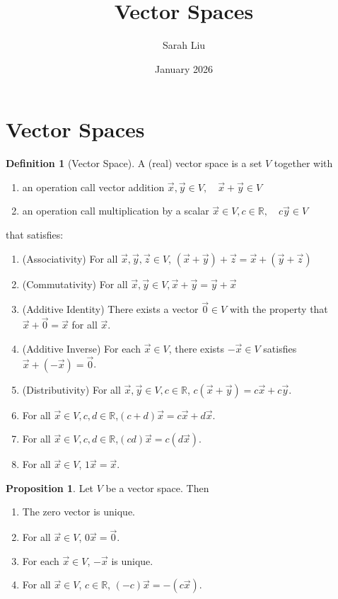 \documentclass{article}
\title{Vector Spaces}
\author{Sarah Liu}
\date{January 2026}
\theoremstyle{definition}
\newtheorem{proposition}[theorem]{Proposition}
\newtheorem{definition}[theorem]{Definition}
\theoremstyle{remark}
\begin{document}
\maketitle

\section{Vector Spaces}
\begin{definition}[Vector Space]
A (real) vector space is a set $V$ together with
\begin{enumerate}
    \item an operation call vector addition $\vec{x},\vec{y}\in V,\quad \vec{x}+\vec{y}\in V$
    \item an operation call multiplication by a scalar $\vec{x}\in V,c\in \mathbb{R}, \quad c\vec{y}\in V$
\end{enumerate}
that satisfies:
\begin{enumerate}
    \item (Associativity) For all $\vec{x},\vec{y}, \vec{z}\in V$, $(\vec{x}+\vec{y})+ \vec{z} = \vec{x}+(\vec{y}+ \vec{z})$
    \item (Commutativity) For all $\vec{x},\vec{y}\in V,\vec{x}+\vec{y}=\vec{y}+\vec{x}$
    \item (Additive Identity) There exists a vector $\vec{0}\in V$ with the property that $\vec{x} + \vec{0}= \vec{x}$ for all $\vec{x}$.
    \item (Additive Inverse) For each $\vec{x}\in V$, there exists $-\vec{x}\in V$ satisfies $\vec{x}+(-\vec{x})=\vec{0}$.
    \item (Distributivity) For all $\vec{x},\vec{y}\in V, c\in\mathbb{R}$, $c(\vec{x}+\vec{y})=c\vec{x}+c\vec{y}$.
    \item For all $\vec{x}\in V, c,d\in\mathbb{R}$,$(c+d)\vec{x}=c\vec{x}+d\vec{x}$.
    \item For all $\vec{x}\in V, c,d\in\mathbb{R}$,$(cd)\vec{x} =c(d\vec{x})$.
    \item For all $\vec{x}\in V$, $1\vec{x}=\vec{x}$.
\end{enumerate}
\end{definition}

\begin{proposition}
Let $V$ be a vector space. Then
\begin{enumerate}
    \item The zero vector is unique.
    \item For all $\vec{x}\in V$, $0\vec{x}=\vec{0}$.
    \item For each $\vec{x}\in V$, $-\vec{x}$ is unique.
    \item For all $\vec{x}\in V$, $c\in\mathbb{R}$, $(-c)\vec{x}=-(c\vec{x})$.
\end{enumerate}
\end{proposition}
\end{document}
